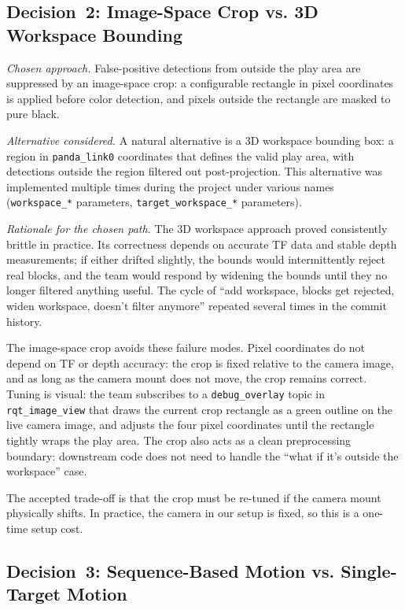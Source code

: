 \documentclass[conference]{IEEEtran}
\begin{document}
\subsection{Decision~2: Image-Space Crop vs. 3D Workspace Bounding}

\textit{Chosen approach.} False-positive detections from outside the
play area are suppressed by an image-space crop: a configurable
rectangle in pixel coordinates is applied before color detection,
and pixels outside the rectangle are masked to pure black.

\textit{Alternative considered.} A natural alternative is a 3D
workspace bounding box: a region in \texttt{panda\_link0} coordinates
that defines the valid play area, with detections outside the region
filtered out post-projection. This alternative was implemented multiple
times during the project under various names (\texttt{workspace\_*}
parameters, \texttt{target\_workspace\_*} parameters).

\textit{Rationale for the chosen path.} The 3D workspace approach
proved consistently brittle in practice. Its correctness depends on
accurate TF data and stable depth measurements; if either drifted
slightly, the bounds would intermittently reject real blocks, and the
team would respond by widening the bounds until they no longer filtered
anything useful. The cycle of ``add workspace, blocks get rejected,
widen workspace, doesn't filter anymore'' repeated several times in
the commit history.

The image-space crop avoids these failure modes. Pixel coordinates do
not depend on TF or depth accuracy: the crop is fixed relative to the
camera image, and as long as the camera mount does not move, the
crop remains correct. Tuning is visual: the team subscribes to a
\texttt{debug\_overlay} topic in \texttt{rqt\_image\_view} that draws
the current crop rectangle as a green outline on the live camera
image, and adjusts the four pixel coordinates until the rectangle
tightly wraps the play area. The crop also acts as a clean
preprocessing boundary: downstream code does not need to handle the
``what if it's outside the workspace'' case.

The accepted trade-off is that the crop must be re-tuned if the
camera mount physically shifts. In practice, the camera in our setup
is fixed, so this is a one-time setup cost.

\subsection{Decision~3: Sequence-Based Motion vs. Single-Target Motion}
\end{document}
